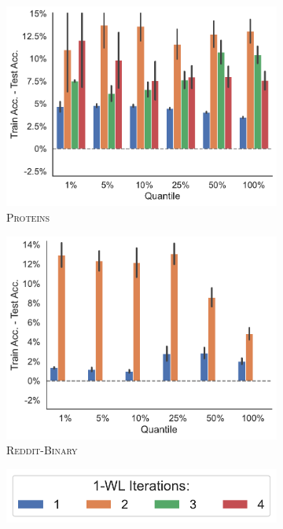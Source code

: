 \begin{figure}[!htb]
\begin{subfigure}[b]{0.3\textwidth}
		\includegraphics[width=\textwidth]{Figures/train_test_diff_k_wl_PROTEINS.pdf}
		\vspace*{-4ex} 
		\caption{\textsc{Proteins}}
	\end{subfigure}
	\hfill
	\begin{subfigure}[b]{0.3\textwidth}
		\centering
		\includegraphics[width=\textwidth]{Figures/train_test_diff_k_wl_REDDIT-BINARY.pdf}
		\vspace*{-4ex} 
		\caption{\textsc{Reddit-Binary}}
	\end{subfigure}
	\begin{subfigure}[b]{0.3\textwidth}
		\centering
		\includegraphics[width=\textwidth]{Figures/train_test_diff_k_wl_legend.pdf}
		\vspace*{-4ex} 
	\end{subfigure}
\end{figure}


